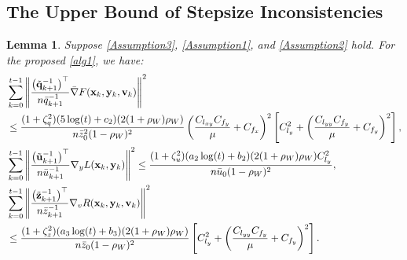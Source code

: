 \documentclass{article}
\theoremstyle{plain}
\newtheorem{lemma}[lemma]{Lemma}
\theoremstyle{definition}
\theoremstyle{remark}
\begin{document}
\subsection{The Upper Bound of Stepsize Inconsistencies}
\begin{lemma}\label{Lemma12}Suppose \cref{Assumption3}, \cref{Assumption1}, and \cref{Assumption2} hold. For the proposed \cref{alg1}, we have:
\begin{align}
&\sum_{k=0}^{t-1} \left\| \frac{\big(\tilde{\mathbf{q}}_{k+1}^{-1}\big)^\top}{n\bar{q}_{k+1}^{-1}} \bar{\nabla} F(\mathbf{x}_k, \mathbf{y}_k, \mathbf{v}_k) \right\|^2\notag\\
&\leq \frac{(1+\zeta_q^2)(5 \log(t) + c_2)(2(1 + \rho_W) \rho_W)}{n\bar{z}_0^2(1 - \rho_W)^2}\left(\frac{C_{l_{xy}}C_{f_y}}{\mu}+C_{f_x}\right)^2\left[C_{l_y}^2+\left(\frac{C_{l_{yy}}C_{f_y}}{\mu}+C_{f_y}\right)^2\right],\notag\\
&\sum_{k=0}^{t-1} \left\| \frac{\big(\tilde{\mathbf{u}}_{k+1}^{-1}\big)^\top}{n\bar{u}_{k+1}^{-1}} {\nabla}_y L(\mathbf{x}_k, \mathbf{y}_k) \right\|^2\leq \frac{(1+\zeta_u^2)(a_2 \log(t) + b_2)(2(1 + \rho_W) \rho_W)C_{l_y}^2}{n\bar{u}_0(1 - \rho_W)^2},\notag\\
&\sum_{k=0}^{t-1} \left\| \frac{\big(\tilde{\mathbf{z}}_{k+1}^{-1}\big)^\top}{n\bar{z}_{k+1}^{-1}} \nabla_v R(\mathbf{x}_k, \mathbf{y}_k, \mathbf{v}_k) \right\|^2\notag\\
&\leq \frac{(1+\zeta_z^2)(a_3 \log(t) + b_3)(2(1 + \rho_W) \rho_W)}{n\bar{z}_0(1 - \rho_W)^2}\left[C_{l_y}^2+\left(\frac{C_{l_{yy}}C_{f_y}}{\mu}+C_{f_y}\right)^2\right].\label{eq112}
\end{align}
\end{lemma}
\end{document}
